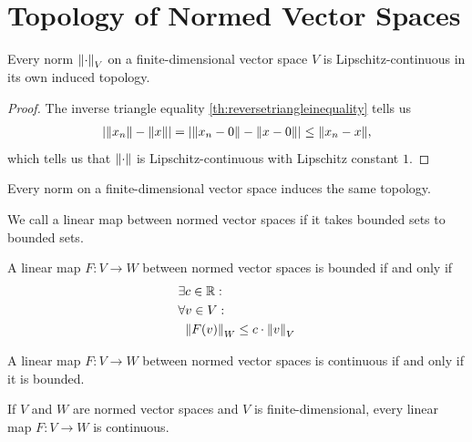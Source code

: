 \section{Topology of Normed Vector Spaces}
\begin{theorem}
	Every norm $\norm{\cdot}_V$ on a finite-dimensional vector space $V$ is Lipschitz-continuous in its own induced topology.
\end{theorem}
\begin{proof}
	The inverse triangle equality \ref{th:reversetriangleinequality} tells us
	\begin{align*}
		\abs{\norm{x_n} - \norm{x}} = \abs{\norm{x_n - 0} - \norm{x - 0}} \leq \norm{x_n - x},
	\end{align*}
	which tells us that $\norm{\cdot}$ is Lipschitz-continuous with Lipschitz constant $1$.
\end{proof}
\begin{importanttheorem}{}{}
	Every norm on a finite-dimensional vector space induces the same topology.
\end{importanttheorem}
\begin{definition}
	We call a linear map between normed vector spaces  if it takes bounded sets to bounded sets.
\end{definition}
\begin{theorem}
	A linear map $F : V \to W$ between normed vector spaces is bounded if and only if
	\begin{align*}
		\exists &c \in \mathbb{R} :\\
		\forall &v \in V :\\
		&\norm{F(v)}_W \leq c \cdot \norm{v}_V
	\end{align*}
\end{theorem}
\begin{theorem}
	A linear map $F : V \to W$ between normed vector spaces is continuous if and only if it is bounded.
\end{theorem}
\begin{corollary}
	If $V$ and $W$ are normed vector spaces and $V$ is finite-dimensional, every linear map $F : V \to W$ is continuous.
\end{corollary}
